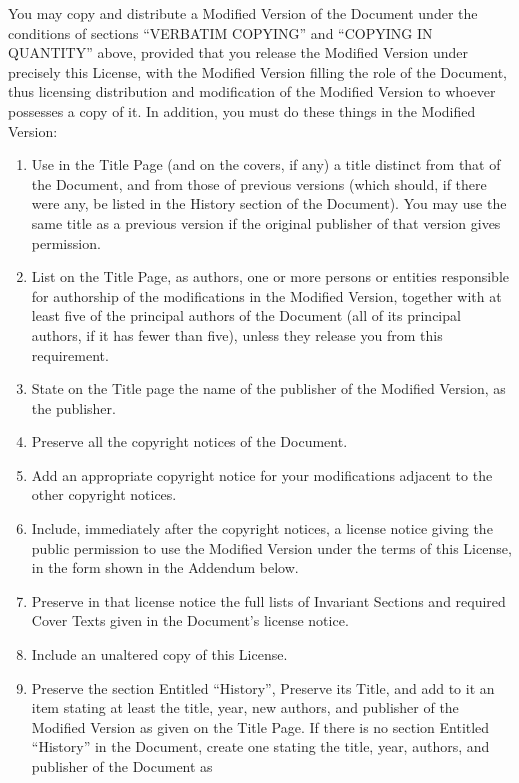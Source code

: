 \documentclass[a4paper,german,10pt,twoside]{book}
\begin{document}
{\begin{appendix}
{You may copy and distribute a Modified Version of the Document under the conditions of sections
``VERBATIM COPYING'' and ``COPYING IN QUANTITY'' above, provided that you release the Modified
Version under precisely this License, with the Modified Version filling the role of the Document,
thus licensing distribution and modification of the Modified Version to whoever possesses a copy of
it.	 In addition, you must do these things in the Modified Version:

\begin{enumerate}%
\item Use in the Title Page (and on the covers, if any) a title distinct
   from that of the Document, and from those of previous versions
   (which should, if there were any, be listed in the History section
   of the Document).  You may use the same title as a previous version
   if the original publisher of that version gives permission.
\item List on the Title Page, as authors, one or more persons or entities
   responsible for authorship of the modifications in the Modified
   Version, together with at least five of the principal authors of the
   Document (all of its principal authors, if it has fewer than five),
   unless they release you from this requirement.
\item State on the Title page the name of the publisher of the
   Modified Version, as the publisher.
\item Preserve all the copyright notices of the Document. \item Add an appropriate copyright notice
for your modifications
   adjacent to the other copyright notices.
\item Include, immediately after the copyright notices, a license notice
   giving the public permission to use the Modified Version under the
   terms of this License, in the form shown in the Addendum below.
\item Preserve in that license notice the full lists of Invariant Sections
   and required Cover Texts given in the Document's license notice.
\item Include an unaltered copy of this License. \item Preserve the section Entitled ``History'',
Preserve its Title, and add
   to it an item stating at least the title, year, new authors, and
   publisher of the Modified Version as given on the Title Page.  If
   there is no section Entitled ``History'' in the Document, create one
   stating the title, year, authors, and publisher of the Document as

\end{enumerate}}
\end{appendix}}
\end{document}

